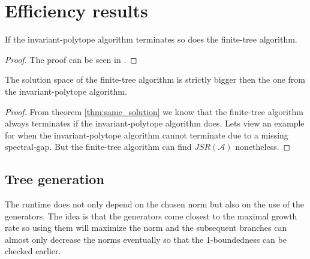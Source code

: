 \section{Efficiency results}

\begin{theorem}
    \label{thm:same_solution}
    If the invariant-polytope algorithm terminates so does the finite-tree algorithm.
\end{theorem}

\begin{proof}
    The proof can be seen in \citep{mollerTreebasedApproachJoint2014}.
\end{proof}

\begin{theorem}
    The solution space of the finite-tree algorithm is strictly bigger then the one from the invariant-polytope algorithm. 
\end{theorem}

\begin{proof}
    From theorem \ref{thm:same_solution} we know that the finite-tree algorithm always terminates if the invariant-polytope algorithm does. 
    Lets view an example for when the invariant-polytope algorithm cannot terminate due to a missing spectral-gap. But the finite-tree algorithm can find $JSR(\mathcal{A})$ nonetheless. 
\end{proof}

\subsection*{Tree generation}
The runtime does not only depend on the chosen norm but also on the use of the generators. 
The idea is that the generators come closest to the maximal growth rate so using them will maximize the norm and the subsequent branches can almost only decrease the norms eventually so that the 1-boundedness can be checked earlier. 


